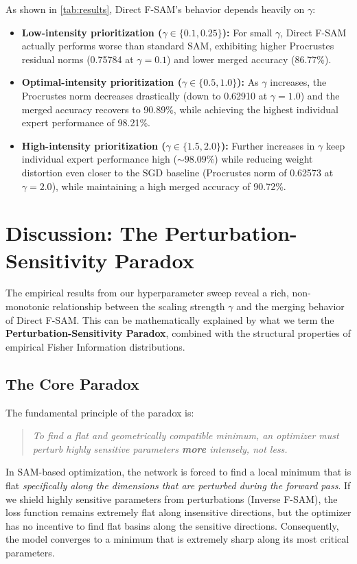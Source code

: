\documentclass{article}
\theoremstyle{plain}
\theoremstyle{definition}
\theoremstyle{remark}
\begin{document}
As shown in \cref{tab:results}, Direct F-SAM's behavior depends heavily on $\gamma$:
\begin{itemize}\setlength{\itemsep}{0pt}\setlength{\parskip}{0pt}\setlength{\parsep}{0pt}
    \item \textbf{Low-intensity prioritization ($\gamma \in \{0.1, 0.25\}$):} For small $\gamma$, Direct F-SAM actually performs worse than standard SAM, exhibiting higher Procrustes residual norms (0.75784 at $\gamma = 0.1$) and lower merged accuracy (86.77\%).
    \item \textbf{Optimal-intensity prioritization ($\gamma \in \{0.5, 1.0\}$):} As $\gamma$ increases, the Procrustes norm decreases drastically (down to 0.62910 at $\gamma = 1.0$) and the merged accuracy recovers to 90.89\%, while achieving the highest individual expert performance of 98.21\%.
    \item \textbf{High-intensity prioritization ($\gamma \in \{1.5, 2.0\}$):} Further increases in $\gamma$ keep individual expert performance high ($\sim 98.09\%$) while reducing weight distortion even closer to the SGD baseline (Procrustes norm of 0.62573 at $\gamma = 2.0$), while maintaining a high merged accuracy of 90.72\%.
\end{itemize}

\section{Discussion: The Perturbation-Sensitivity Paradox}
\label{sec:discussion}

The empirical results from our hyperparameter sweep reveal a rich, non-monotonic relationship between the scaling strength $\gamma$ and the merging behavior of Direct F-SAM. This can be mathematically explained by what we term the \textbf{Perturbation-Sensitivity Paradox}, combined with the structural properties of empirical Fisher Information distributions.

\subsection{The Core Paradox}
The fundamental principle of the paradox is:
\begin{quote}
    \textit{To find a flat and geometrically compatible minimum, an optimizer must perturb highly sensitive parameters \textbf{more} intensely, not less.}
\end{quote}
In SAM-based optimization, the network is forced to find a local minimum that is flat \textit{specifically along the dimensions that are perturbed during the forward pass}. If we shield highly sensitive parameters from perturbations (Inverse F-SAM), the loss function remains extremely flat along insensitive directions, but the optimizer has no incentive to find flat basins along the sensitive directions. Consequently, the model converges to a minimum that is extremely sharp along its most critical parameters.
\end{document}
